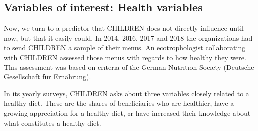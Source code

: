 \documentclass[12pt, a4paper, titlepage]{article}\usepackage[]{graphicx}\usepackage[]{color}
\begin{document}
\begin{table}
\begin{center}
\caption{Regression Results: dayToDaySkills}
\label{DayToDaySkillsRegressions}
\end{center}
\end{table}


\subsection{Variables of interest: Health variables} 

Now, we turn to a predictor that CHILDREN does not directly influence until now, but that it easily could. In 2014, 2016, 2017 and 2018 the organizations had to send CHILDREN a sample of their menus. An ecotrophologist collaborating with CHILDREN assessed those menus with regards to how healthy they were. This assessment was based on criteria of the German Nutrition Society (Deutsche Gesellschaft für Ernährung).

In its yearly surveys, CHILDREN asks about three variables closely related to a healthy diet. These are the shares of beneficiaries who are healthier, have a growing appreciation for a healthy diet, or have increased their knowledge about what constitutes a healthy diet.
\end{document}
